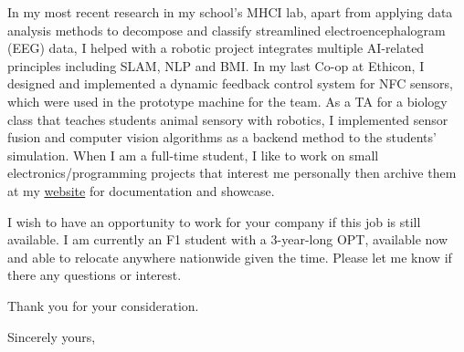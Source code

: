 \documentclass[11pt]{letter} %
\begin{document}
\begin{letter}
\par In my most recent research in my school's MHCI lab, apart from applying data analysis methods to decompose and classify streamlined electroencephalogram (EEG) data, I helped with a robotic project integrates multiple AI-related principles including SLAM, NLP and BMI.
In my last Co-op at Ethicon, I designed and implemented a dynamic feedback control system for NFC sensors, which were used in the prototype machine for the team.
As a TA for a biology class that teaches students animal sensory with robotics, I implemented sensor fusion and computer vision algorithms as a backend method to the students' simulation.
When I am a full-time student, I like to work on small electronics/programming projects that interest me personally then archive them at my \href{https://liu2z2.github.io/tags#project-ref}{website} for documentation and showcase.

\par I wish to have an opportunity to work for your company if this job is still available.
I am currently an F1 student with a 3-year-long OPT, available now and able to relocate anywhere nationwide given the time.
Please let me know if there any questions or interest.

\par Thank you for your consideration.

\closing{Sincerely yours,}




\end{letter}
\end{document}
